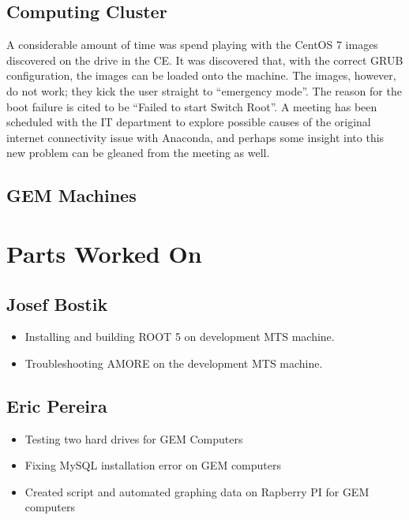 \documentclass[12pt]{article}
\newcommand\tab[1][1cm]{\hspace*{#1}}
\begin{document}
\subsection{Computing Cluster}

\tab A considerable amount of time was spend playing with the CentOS 7 images
discovered on the drive in the CE. It was discovered that, with the correct GRUB
configuration, the images can be loaded onto the machine. The images, however,
do not work; they kick the user straight to ``emergency mode''. The reason for
the boot failure is cited to be ``Failed to start Switch Root''. A meeting has
been scheduled with the IT department to explore possible causes of the original
internet connectivity issue with Anaconda, and perhaps some insight into this
new problem can be gleaned from the meeting as well.

\subsection{GEM Machines}


\section{Parts Worked On}

\subsection{Josef Bostik}

\begin{itemize}
\item Installing and building ROOT 5 on development MTS machine.
\item Troubleshooting AMORE on the development MTS machine.
\end{itemize}

\subsection{Eric Pereira}

\begin{itemize}
\item Testing two hard drives for GEM Computers
\item Fixing MySQL installation error on GEM computers
\item Created script and automated graphing data on Rapberry PI for GEM computers
\end{itemize}
\end{document}
